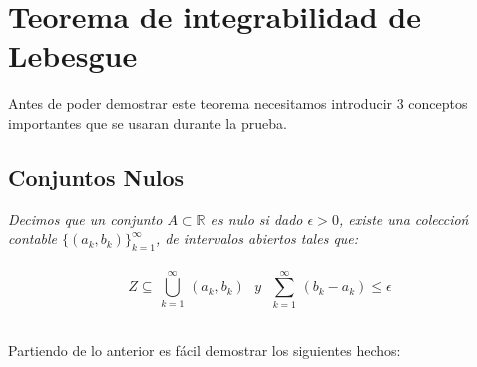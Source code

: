 \documentclass[11pt,letterpaper]{article}
\newcommand{\R}{\mathbb{R}}
\newcommand{\N}{\mathbb{N}}
\begin{document}
\section*{Teorema de integrabilidad de Lebesgue}
Antes de poder demostrar este teorema necesitamos introducir 3 conceptos importantes que se usaran durante la prueba.
\subsection*{Conjuntos Nulos}
\begin{tcolorbox}[
	title = \textcolor{black}{\textcolor{white}{Definici\'on 1}},]
\textit{Decimos que un conjunto $A\subset \R$ es nulo si dado $\epsilon>0$, existe una coleccio\'n contable $\{(a_k,b_k)\}_{k=1}^{\infty}$, de intervalos abiertos tales que:\,\\
\,\\
\begin{equation*}
    Z\subseteq\,\bigcup_{k=1}^{\infty}\,(a_k,b_k)\,\,\,\,y\,\,\,\,\sum_{k=1}^{\infty}\,(b_k-a_k)\leq \epsilon
\end{equation*}}
\end{tcolorbox}\,\\
Partiendo de lo anterior es fácil demostrar los siguientes hechos:
\end{document}
